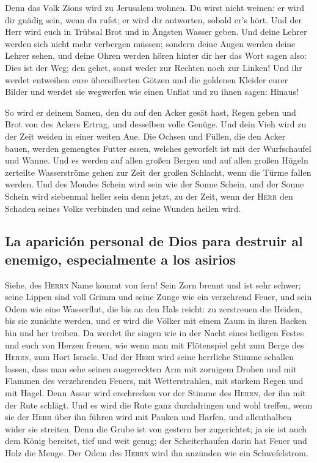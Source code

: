  Denn das Volk Zions wird zu Jerusalem wohnen. Du wirst
nicht weinen: er wird dir gnädig sein, wenn du rufst; er wird dir
antworten, sobald er's hört.  Und der Herr wird euch in
Trübsal Brot und in Ängsten Wasser geben. Und deine Lehrer werden sich
nicht mehr verbergen müssen; sondern deine Augen werden deine Lehrer
sehen,  und deine Ohren werden hören hinter dir her das
Wort sagen also: Dies ist der Weg; den gehet, sonst weder zur Rechten
noch zur Linken!  Und ihr werdet entweihen eure
übersilberten Götzen und die goldenen Kleider eurer Bilder und werdet
sie wegwerfen wie einen Unflat und zu ihnen sagen: Hinaus!

 So wird er deinem Samen, den du auf den Acker gesät
hast, Regen geben und Brot von des Ackers Ertrag, und desselben volle
Genüge. Und dein Vieh wird zu der Zeit weiden in einer weiten Aue.
 Die Ochsen und Füllen, die den Acker bauen, werden
gemengtes Futter essen, welches geworfelt ist mit der Wurfschaufel und
Wanne.  Und es werden auf allen großen Bergen und auf
allen großen Hügeln zerteilte Wasserströme gehen zur Zeit der großen
Schlacht, wenn die Türme fallen werden.  Und des Mondes
Schein wird sein wie der Sonne Schein, und der Sonne Schein wird
siebenmal heller sein denn jetzt, zu der Zeit, wenn der \textsc{Herr}
den Schaden seines Volks verbinden und seine Wunden heilen wird.

\hypertarget{la-apariciuxf3n-personal-de-dios-para-destruir-al-enemigo-especialmente-a-los-asirios}{%
\subsection{La aparición personal de Dios para destruir al enemigo,
especialmente a los
asirios}\label{la-apariciuxf3n-personal-de-dios-para-destruir-al-enemigo-especialmente-a-los-asirios}}

 Siehe, des \textsc{Herrn} Name kommt von fern! Sein Zorn
brennt und ist sehr schwer; seine Lippen sind voll Grimm und seine Zunge
wie ein verzehrend Feuer,  und sein Odem wie eine
Wasserflut, die bis an den Hals reicht: zu zerstreuen die Heiden, bis
sie zunichte werden, und er wird die Völker mit einem Zaum in ihren
Backen hin und her treiben.  Da werdet ihr singen wie in
der Nacht eines heiligen Festes und euch von Herzen freuen, wie wenn man
mit Flötenspiel geht zum Berge des \textsc{Herrn}, zum Hort Israels.
 Und der \textsc{Herr} wird seine herrliche Stimme
schallen lassen, dass man sehe seinen ausgereckten Arm mit zornigem
Drohen und mit Flammen des verzehrenden Feuers, mit Wetterstrahlen, mit
starkem Regen und mit Hagel.  Denn Assur wird erschrecken
vor der Stimme des \textsc{Herrn}, der ihn mit der Rute schlägt.
 Und es wird die Rute ganz durchdringen und wohl treffen,
wenn sie der \textsc{Herr} über ihn führen wird mit Pauken und Harfen,
und allenthalben wider sie streiten.  Denn die Grube ist
von gestern her zugerichtet; ja sie ist auch dem König bereitet, tief
und weit genug; der Scheiterhaufen darin hat Feuer und Holz die Menge.
Der Odem des \textsc{Herrn} wird ihn anzünden wie ein Schwefelstrom.

